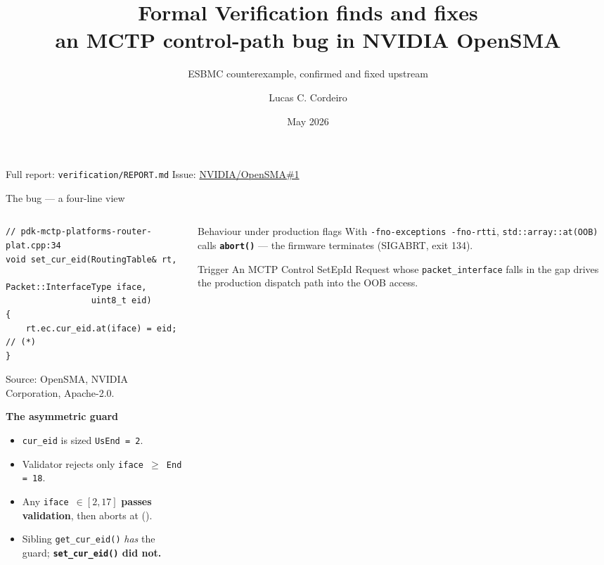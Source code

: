\documentclass[aspectratio=169,11pt]{beamer}
\title[FV in NVIDIA OpenSMA]{Formal Verification finds and fixes\\an MCTP control-path bug in NVIDIA OpenSMA}
\subtitle{ESBMC counterexample, confirmed and fixed upstream}
\author[Cordeiro]{Lucas C. Cordeiro}
\institute[Univ.\ of Manchester]{University of Manchester \\ \textit{lucas.cordeiro@manchester.ac.uk}}
\date{May 2026}
\newcommand{\hil}[1]{\textbf{\textcolor{nvgreendark}{#1}}}
\newcommand{\bad}[1]{\textbf{\textcolor{nvred}{#1}}}
\begin{document}
\begin{frame}
  \titlepage
  \vspace{-1.0em}
  \begin{center}
    \scriptsize\textcolor{nvgray}{Full report: \texttt{verification/REPORT.md}
    \textbar{} Issue:
    \href{https://github.com/NVIDIA/OpenSMA/issues/1}{NVIDIA/OpenSMA\#1}}
  \end{center}
\end{frame}

\begin{frame}[fragile]{The bug --- a four-line view}
  \begin{columns}[T,onlytextwidth]
    \begin{column}{0.52\textwidth}
\begin{lstlisting}[basicstyle=\ttfamily\tiny]
// pdk-mctp-platforms-router-plat.cpp:34
void set_cur_eid(RoutingTable& rt,
                 Packet::InterfaceType iface,
                 uint8_t eid)
{
    rt.ec.cur_eid.at(iface) = eid;  // (*)
}
\end{lstlisting}

{\tiny\textcolor{nvgray}{Source: OpenSMA, \textcopyright{} NVIDIA Corporation,
Apache-2.0.}}

\vspace{0.4em}
\scriptsize
\textbf{The asymmetric guard}
\begin{itemize}\setlength\itemsep{0.1em}
  \item \texttt{cur\_eid} is sized \texttt{UsEnd = 2}.
  \item Validator rejects only \texttt{iface $\geq$ End = 18}.
  \item Any \texttt{iface $\in [2, 17]$} \hil{passes validation},
        then aborts at (\textasteriskcentered).
  \item Sibling \texttt{get\_cur\_eid()} \emph{has} the guard;
        \bad{\texttt{set\_cur\_eid()} did not.}
\end{itemize}
    \end{column}

    \begin{column}{0.46\textwidth}
      \begin{block}{Behaviour under production flags}
        \scriptsize
        With \texttt{-fno-exceptions -fno-rtti},
        \texttt{std::array::at(OOB)} calls \hil{\texttt{abort()}} ---
        the firmware terminates (SIGABRT, exit 134).
      \end{block}

      \vspace{0.3em}
      \begin{block}{Trigger}
        \scriptsize
        An MCTP Control SetEpId Request whose
        \texttt{packet\_interface} falls in the gap drives the
        production dispatch path into the OOB access.
      \end{block}
    \end{column}
  \end{columns}
\end{frame}
\end{document}
